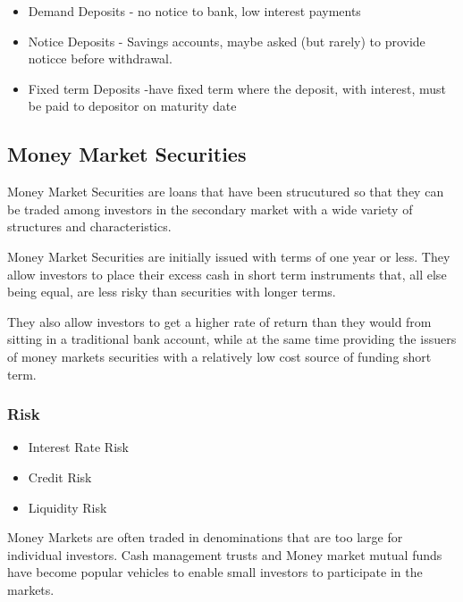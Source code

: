 \begin{itemize}
\item Demand Deposits - no notice to bank, low interest payments
\item Notice Deposits - Savings accounts, maybe asked (but rarely) to provide noticce before withdrawal.
\item Fixed term Deposits -have fixed term where the deposit, with interest, must be paid to depositor on maturity date
\end{itemize}





\subsection*{Money Market Securities}

Money Market Securities are loans that have been strucutured so that they can be traded among investors in the secondary market
with a wide variety of structures and characteristics.

Money Market Securities are initially issued with terms of one year or less. They allow investors to place their excess cash in short
term instruments that, all else being equal, are less risky than securities with longer terms.

They also allow investors to get a higher rate of return than they would from sitting in a traditional bank account, while at the same time providing the issuers
of money markets securities with a relatively low cost source of funding short term.

\subsubsection*{Risk}
\begin{itemize}
\item Interest Rate Risk
\item Credit Risk
\item Liquidity Risk
\end{itemize}

Money Markets are often traded in denominations that are too large for individual investors.
Cash management trusts and Money market mutual funds have become popular vehicles to enable small investors to participate in the markets.
